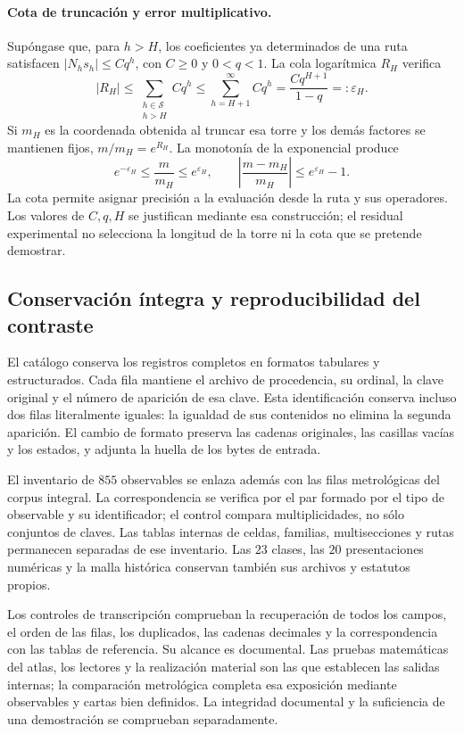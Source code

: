 \paragraph{Cota de truncación y error multiplicativo.}
Supóngase que, para \(h>H\), los coeficientes ya determinados de una
ruta satisfacen \(|N_hs_h|\leq Cq^h\), con \(C\geq0\) y
\(0<q<1\). La cola logarítmica \(R_H\) verifica
\[
 |R_H|\leq\sum_{\substack{h\in\mathcal S\\h>H}}Cq^h
 \leq\sum_{h=H+1}^{\infty}Cq^h
 =\frac{Cq^{H+1}}{1-q}=:\varepsilon_H.
\]
Si \(m_H\) es la coordenada obtenida al truncar esa torre y los demás
factores se mantienen fijos, \(m/m_H=e^{R_H}\). La monotonía de la
exponencial produce
\[
 e^{-\varepsilon_H}\leq\frac{m}{m_H}\leq e^{\varepsilon_H},
 \qquad
 \left|\frac{m-m_H}{m_H}\right|\leq e^{\varepsilon_H}-1.
\]
La cota permite asignar precisión a la evaluación desde la ruta y sus
operadores. Los valores de \(C,q,H\) se justifican mediante esa
construcción; el residual experimental no selecciona la longitud de la
torre ni la cota que se pretende demostrar.

\subsection{Conservación íntegra y reproducibilidad del contraste}
\label{vi:subsec:vi-catalogo-reproducible}

El catálogo conserva los registros completos en formatos tabulares y
estructurados. Cada fila mantiene el archivo de procedencia, su ordinal,
la clave original y el número de aparición de esa clave. Esta
identificación conserva incluso dos filas literalmente iguales: la
igualdad de sus contenidos no elimina la segunda aparición. El cambio
de formato preserva las cadenas originales, las casillas vacías y los
estados, y adjunta la huella de los bytes de entrada.

El inventario de \(855\) observables se enlaza además con las filas
metrológicas del corpus integral. La correspondencia se verifica
por el par formado por el tipo de observable y su identificador; el
control compara multiplicidades, no sólo conjuntos de claves. Las tablas
internas de celdas, familias, multisecciones y rutas permanecen separadas
de ese inventario. Las \(23\) clases, las \(20\) presentaciones
numéricas y la malla histórica conservan también sus archivos y estatutos
propios.

Los controles de transcripción comprueban la recuperación de todos los
campos, el orden de las filas, los duplicados, las cadenas decimales y la
correspondencia con las tablas de referencia. Su alcance es documental.
Las pruebas matemáticas del atlas, los lectores y la realización material
son las que establecen las salidas internas; la comparación metrológica
completa esa exposición mediante observables y cartas bien definidos.
La integridad documental y la suficiencia de una demostración se
comprueban separadamente.

